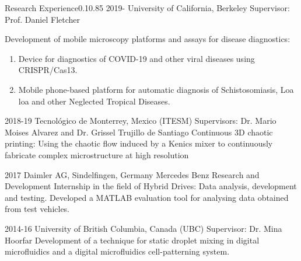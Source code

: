\documentclass{federico_cv}
\begin{document}
\begin{tblSection}{Research Experience}{0.1}{0.85}
\job
{2019-}
{University of California, Berkeley}
{Supervisor: Prof. Daniel Fletcher}
{Development of mobile microscopy platforms and assays for disease diagnostics: 
    \begin{enumerate}[noitemsep,nosep,nolistsep,topsep=0pt,parsep=0pt,partopsep=0pt]
        \item Device for diagnostics of COVID-19 and other viral diseases using CRISPR/Cas13.
        \item Mobile phone-based platform for automatic diagnosis of Schistosomiasis, Loa loa and other Neglected Tropical Diseases.
    \end{enumerate}
}

\job
{2018-19}
{Tecnológico de Monterrey, Mexico (ITESM)}
{Supervisors: Dr. Mario Moises Alvarez and Dr. Grissel Trujillo de Santiago}
{Continuous 3D chaotic printing: Using the chaotic flow induced by a Kenics mixer to continuously fabricate complex microstructure at high resolution}

\job
{2017}
{Daimler AG, Sindelfingen, Germany}
{Mercedes Benz Research and Development}
{Internship in the field of Hybrid Drives: Data analysis, development and testing. Developed a MATLAB evaluation tool for analysing data obtained from test vehicles.}

\job
{2014-16}
{University of British Columbia, Canada (UBC)}
{Supervisor: Dr. Mina Hoorfar}
{Development of a technique for static droplet mixing in digital microfluidics and a digital microfluidics cell-patterning system.}

\end{tblSection}
\let\thefootnote\relax{}\nocite{*}
\printbibliography[keyword={Publications},title={Publications},resetnumbers=true]
\printbibliography[keyword={Patents},title={Patents},resetnumbers=true]
\end{document}
